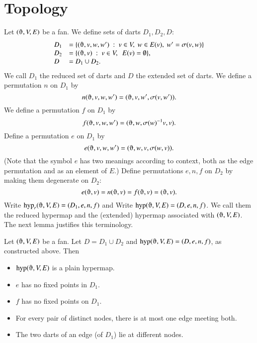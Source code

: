 \section{Topology}\label{sec:topology}

Let $(\orgn,V,E)$ be a fan.  We define sets of darts $D_1,D_2,D$:
    $$
    \begin{array}{lll}
    D_1 &= \{(\orgn,v,w,w')\mid v\in V,\ w\in E(v),\ w' = \sigma(v,w)\}\\
    D_2 &= \{(\orgn,v) \mid v\in V,\ \ E(v) = \emptyset\},\\
    D   &= D_1\cup D_2.
    \end{array}
    $$
We call $D_1$ the reduced set of darts and $D$ the extended set of darts.
%
We define a permutation $n$ on $D_1$ by
    $$n(\orgn,v,w,w') = (\orgn,v,w',\sigma(v,w')).$$
We define a permutation $f$ on $D_1$ by
    $$
    f (\orgn,v,w,w') = (\orgn,w,\sigma(w)^{-1} v,v).
    $$
Define a permutation $e$ on $D_1$ by
    $$
    e (\orgn,v,w,w') = (\orgn,w,v,\sigma(w,v)).
    $$
(Note that the symbol $e$ has two meanings according to context, both
as the edge permutation and as an element of $E$.)
Define permutations $e,n,f$ on $D_2$ by making them degenerate on $D_2$:
    $$
    e (\orgn,v) = n(\orgn,v) = f(\orgn,v) = (\orgn,v).
    $$
Write $\op{hyp}_r(\orgn,V,E)=(D_1,e,n,f)$ and
Write $\op{hyp}(\orgn,V,E)=(D,e,n,f)$.  We call them the reduced hypermap
and the (extended) hypermap associated with $(\orgn,V,E)$.  The next
lemma justifies this terminology.



\begin{lemma}
Let $(\orgn,V,E)$ be a fan.  Let $D = D_1\cup D_2$
and $\op{hyp}(\orgn,V,E) = (D,e,n,f)$, as constructed above.  Then
    \begin{itemize}
    \item $\op{hyp}(\orgn,V,E)$ is a plain hypermap.
    \item  $e$ has no fixed
points in $D_1$.
    \item  $f$ has no fixed points on $D_1$.
    \item For every pair of distinct nodes, there is at most one
    edge meeting both.
    \item The two darts of an edge (of $D_1$) lie at different nodes.
    \end{itemize}
\end{lemma}

